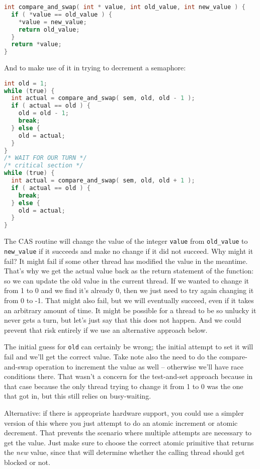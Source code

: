 \begin{lstlisting}[language=C]
int compare_and_swap( int * value, int old_value, int new_value ) {
  if ( *value == old_value ) {
    *value = new_value;
    return old_value;
  }
  return *value;
}
\end{lstlisting}

And to make use of it in trying to decrement a semaphore:

\begin{lstlisting}[language=C]
int old = 1;
while (true) {
  int actual = compare_and_swap( sem, old, old - 1 );
  if ( actual == old ) {
    old = old - 1;
    break;
  } else {
    old = actual;
  }
}
/* WAIT FOR OUR TURN */
/* critical section */
while (true) {
  int actual = compare_and_swap( sem, old, old + 1 );
  if ( actual == old ) {
    break;
  } else {
    old = actual;
  }
}
\end{lstlisting}

The CAS routine will change the value of the integer \texttt{value} from \texttt{old\_value} to \texttt{new\_value} if it succeeds and make no change if it did not succeed. Why might it fail? It might fail if some other thread has modified the value in the meantime. That's why we get the actual value back as the return statement of the function: so we can update the old value in the current thread. If we wanted to change it from 1 to 0 and we find it's already 0, then we just need to try again changing it from 0 to -1. That might also fail, but we will eventually succeed, even if it takes an arbitrary amount of time. It might be possible for a thread to be so unlucky it never gets a turn, but let's just say that this does not happen. And we could prevent that risk entirely if we use an alternative approach below.

The initial guess for \texttt{old} can certainly be wrong; the initial attempt to set it will fail and we'll get the correct value. Take note also the need to do the compare-and-swap operation to increment the value as well -- otherwise we'll have race conditions there. That wasn't a concern for the test-and-set approach because in that case because the only thread trying to change it from 1 to 0 was the one that got in, but this still relies on busy-waiting.

Alternative: if there is appropriate hardware support, you could use a simpler version of this where you just attempt to do an atomic increment or atomic decrement. That prevents the scenario where multiple attempts are necessary to get the value. Just make sure to choose the correct atomic primitive that returns the \textit{new} value, since that will determine whether the calling thread should get blocked or not. 

